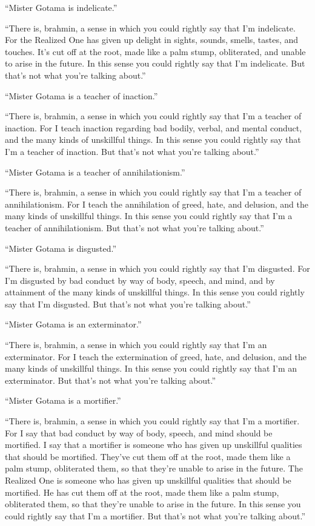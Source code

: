 \documentclass[12pt,openany]{book}%
\begin{document}
“Mister Gotama is indelicate.” 

“There is, brahmin, a sense in which you could rightly say that I’m indelicate. For the Realized One has given up delight in sights, sounds, smells, tastes, and touches. It’s cut off at the root, made like a palm stump, obliterated, and unable to arise in the future. In this sense you could rightly say that I’m indelicate. But that’s not what you’re talking about.” 

“Mister Gotama is a teacher of inaction.” 

“There is, brahmin, a sense in which you could rightly say that I’m a teacher of inaction. For I teach inaction regarding bad bodily, verbal, and mental conduct, and the many kinds of unskillful things. In this sense you could rightly say that I’m a teacher of inaction. But that’s not what you’re talking about.” 

“Mister Gotama is a teacher of annihilationism.” 

“There is, brahmin, a sense in which you could rightly say that I’m a teacher of annihilationism. For I teach the annihilation of greed, hate, and delusion, and the many kinds of unskillful things. In this sense you could rightly say that I’m a teacher of annihilationism. But that’s not what you’re talking about.” 

“Mister Gotama is disgusted.” 

“There is, brahmin, a sense in which you could rightly say that I’m disgusted. For I’m disgusted by bad conduct by way of body, speech, and mind, and by attainment of the many kinds of unskillful things. In this sense you could rightly say that I’m disgusted. But that’s not what you’re talking about.” 

“Mister Gotama is an exterminator.” 

“There is, brahmin, a sense in which you could rightly say that I’m an exterminator. For I teach the extermination of greed, hate, and delusion, and the many kinds of unskillful things. In this sense you could rightly say that I’m an exterminator. But that’s not what you’re talking about.” 

“Mister Gotama is a mortifier.” 

“There is, brahmin, a sense in which you could rightly say that I’m a mortifier. For I say that bad conduct by way of body, speech, and mind should be mortified. I say that a mortifier is someone who has given up unskillful qualities that should be mortified. They’ve cut them off at the root, made them like a palm stump, obliterated them, so that they’re unable to arise in the future. The Realized One is someone who has given up unskillful qualities that should be mortified. He has cut them off at the root, made them like a palm stump, obliterated them, so that they’re unable to arise in the future. In this sense you could rightly say that I’m a mortifier. But that’s not what you’re talking about.” 
\end{document}
